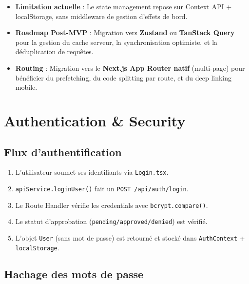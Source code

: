 \documentclass[12pt, a4paper]{article}
\begin{document}
\begin{warnbox}
\begin{itemize}
  \item \textbf{Limitation actuelle} : Le state management repose sur Context API + localStorage, sans middleware de gestion d'effets de bord.
  \item \textbf{Roadmap Post-MVP} : Migration vers \textbf{Zustand} ou \textbf{TanStack Query} pour la gestion du cache serveur, la synchronisation optimiste, et la déduplication de requêtes.
  \item \textbf{Routing} : Migration vers le \textbf{Next.js App Router natif} (multi-page) pour bénéficier du prefetching, du code splitting par route, et du deep linking mobile.
\end{itemize}
\end{warnbox}

\section{Authentication \& Security}

\subsection{Flux d'authentification}

\begin{enumerate}[leftmargin=2em]
  \item L'utilisateur soumet ses identifiants via \texttt{Login.tsx}.
  \item \texttt{apiService.loginUser()} fait un \texttt{POST /api/auth/login}.
  \item Le Route Handler vérifie les credentials avec \texttt{bcrypt.compare()}.
  \item Le statut d'approbation (\texttt{pending/approved/denied}) est vérifié.
  \item L'objet \texttt{User} (sans mot de passe) est retourné et stocké dans \texttt{AuthContext} + \texttt{localStorage}.
\end{enumerate}

\subsection{Hachage des mots de passe}
\end{document}
